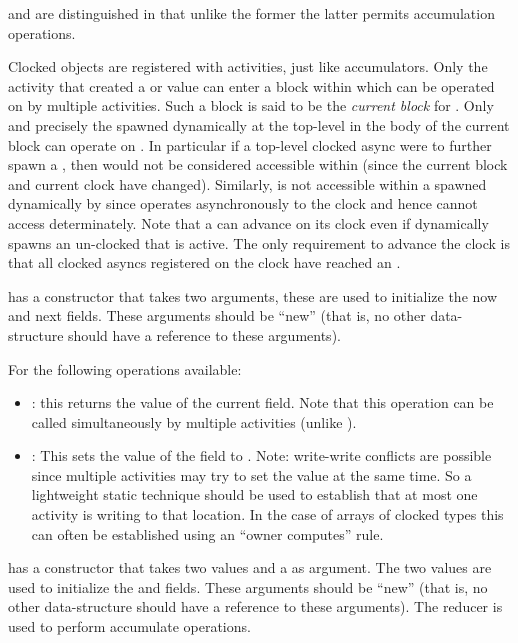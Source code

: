  and  are distinguished in that
unlike the former the latter permits accumulation operations.

Clocked objects are registered with activities, just like
accumulators.  Only the activity that created a
 or  value  can enter a
 block within which  can be operated on
by multiple activities. Such a block is said to be the {\em current
  block} for . Only and precisely the  
spawned dynamically at the top-level in the body of the current block
can operate on . In particular if a top-level clocked async
were to further spawn a , then  would
not be considered accessible within  (since the current block
and current clock have changed).  Similarly,  is not accessible within a
 spawned dynamically by  since 
operates asynchronously to the clock and hence cannot access 
determinately. Note that a  can advance on its
clock even if  dynamically spawns an un-clocked 
that is active. The only requirement to advance the clock is that all
clocked asyncs registered on the clock have reached an
.


  has a constructor that takes two  arguments, these are
used to initialize the now and next fields. These arguments should be
``new'' (that is, no other data-structure should have a reference to
these arguments).

For  the following operations available:
\begin{itemize}
\item {}: this returns the value of the current field. Note
  that this operation can be called simultaneously by multiple
  activities  (unlike ).

\item {}: This sets the value of the  field to .
Note: write-write conflicts are possible since multiple activities may
try to set the value at the same time. So a lightweight static
technique should be used to establish that at most one activity is
writing to that location. In the case of arrays of clocked types this
can often be established using an ``owner computes'' rule.
\end{itemize}

 has a constructor that takes two  values and a
 as argument. The two  values are used to initialize the
 and  fields. These arguments should be ``new'' (that is, no
other data-structure should have a reference to these arguments).
The reducer is used to perform
accumulate operations.

